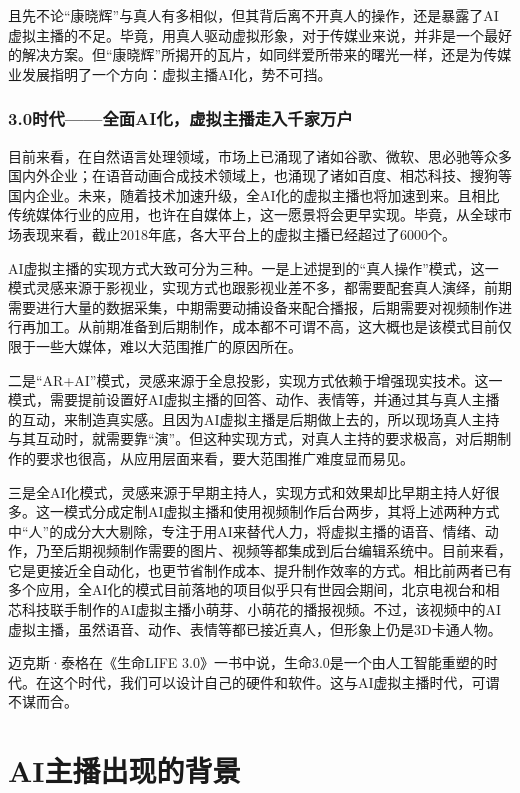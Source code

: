 \documentclass[11pt, a4paper, oneside]{ctexbook}
\begin{document}
且先不论“康晓辉”与真人有多相似，但其背后离不开真人的操作，还是暴露了AI虚拟主播的不足。毕竟，用真人驱动虚拟形象，对于传媒业来说，并非是一个最好的解决方案。但“康晓辉”所揭开的瓦片，如同绊爱所带来的曙光一样，还是为传媒业发展指明了一个方向：虚拟主播AI化，势不可挡。

\subsection{3.0时代——全面AI化，虚拟主播走入千家万户}
目前来看，在自然语言处理领域，市场上已涌现了诸如谷歌、微软、思必驰等众多国内外企业；在语音动画合成技术领域上，也涌现了诸如百度、相芯科技、搜狗等国内企业。未来，随着技术加速升级，全AI化的虚拟主播也将加速到来。且相比传统媒体行业的应用，也许在自媒体上，这一愿景将会更早实现。毕竟，从全球市场表现来看，截止2018年底，各大平台上的虚拟主播已经超过了6000个。

AI虚拟主播的实现方式大致可分为三种。一是上述提到的“真人操作”模式，这一模式灵感来源于影视业，实现方式也跟影视业差不多，都需要配套真人演绎，前期需要进行大量的数据采集，中期需要动捕设备来配合播报，后期需要对视频制作进行再加工。从前期准备到后期制作，成本都不可谓不高，这大概也是该模式目前仅限于一些大媒体，难以大范围推广的原因所在。

二是“AR+AI”模式，灵感来源于全息投影，实现方式依赖于增强现实技术。这一模式，需要提前设置好AI虚拟主播的回答、动作、表情等，并通过其与真人主播的互动，来制造真实感。且因为AI虚拟主播是后期做上去的，所以现场真人主持与其互动时，就需要靠“演”。但这种实现方式，对真人主持的要求极高，对后期制作的要求也很高，从应用层面来看，要大范围推广难度显而易见。

三是全AI化模式，灵感来源于早期主持人，实现方式和效果却比早期主持人好很多。这一模式分成定制AI虚拟主播和使用视频制作后台两步，其将上述两种方式中“人”的成分大大剔除，专注于用AI来替代人力，将虚拟主播的语音、情绪、动作，乃至后期视频制作需要的图片、视频等都集成到后台编辑系统中。目前来看，它是更接近全自动化，也更节省制作成本、提升制作效率的方式。相比前两者已有多个应用，全AI化的模式目前落地的项目似乎只有世园会期间，北京电视台和相芯科技联手制作的AI虚拟主播小萌芽、小萌花的播报视频。不过，该视频中的AI虚拟主播，虽然语音、动作、表情等都已接近真人，但形象上仍是3D卡通人物。

迈克斯·泰格在《生命LIFE 3.0》一书中说，生命3.0是一个由人工智能重塑的时代。在这个时代，我们可以设计自己的硬件和软件。这与AI虚拟主播时代，可谓不谋而合。
\chapter{AI主播出现的背景}
\end{document}
